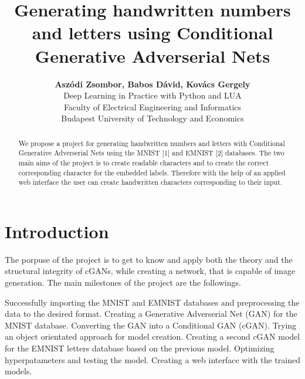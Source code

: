 \documentclass[lettersize,journal]{IEEEtran}
\begin{document}
\title{Generating handwritten numbers and letters using Conditional Generative Adverserial Nets}

\author{\textbf{Aszódi Zsombor, Babos Dávid, Kovács Gergely}\\
Deep Learning in Practice with Python and LUA\\
Faculty of Electrical Engineering and Informatics\\
Budapest University of Technology and Economics
}


\maketitle

\begin{abstract}
We propose a project for generating handwritten numbers and letters with Conditional Generative Adverserial Nets using the MNIST [1] and EMNIST [2] databases. The two main aims of the project is to create readable characters and to create the correct corresponding character for the embedded labels. Therefore with the help of an applied web interface the user can create handwritten characters corresponding to their input.
\end{abstract}


\section{Introduction}
The porpuse of the project is to get to know and apply both the theory and the structural integrity of cGANs, while creating a network, that is capable of image generation.
The main milestones of the project are the followings. 

Successfully importing the MNIST and EMNIST databases and preprocessing the data to the desired format.
Creating a Generative Adverserial Net (GAN) for the MNIST database.
Converting the GAN into a Conditional GAN (cGAN).
Trying an object orientated approach for model creation.
Creating a second cGAN model for the EMNIST letters database based on the previous model.
Optimizing hyperpatameters and testing the model.
Creating a web interface with the trained models.
\end{document}
